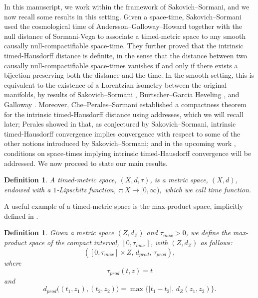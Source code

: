 \documentclass[a4paper,12pt,reqno]{amsart}
\theoremstyle{plain}
\newtheorem{defn}[thm]{Definition}
\newcommand{\be}{\begin{equation}}
\newcommand{\ee}{\end{equation}}
\begin{document}
In this manuscript, we work within the framework of Sakovich--Sormani, and we now recall some results in this setting. Given a space-time, Sakovich--Sormani \cite{SakSor-Notions} used the cosmological time of Andersson--Galloway--Howard \cite{AGH} together with the null distance of Sormani-Vega \cite{SV-Null} to associate a timed-metric space to any smooth causally null-compactifiable space-time. They further proved that the intrinsic timed-Hausdorff distance is definite, in the sense that the distance between two causally null-compactifiable space-times vanishes if and only if there exists a bijection preserving both the distance and the time. In the smooth setting, this is equivalent to the existence of a Lorentzian isometry between the original manifolds, by results of Sakovich--Sormani \cite{SakSor-Null}, Burtscher--Garcia Heveling \cite{Burtscher-Garcia-Heveling-Global}, and Galloway \cite{Galloway-causal}. Moreover, Che--Perales--Sormani \cite{Che-Perales-Sormani-2025} established a compactness theorem for the intrinsic timed-Hausdorff distance using addresses, which we will recall later; Perales showed in \cite{perales-intrinsic-timed-hausdorff} that, as conjectured by Sakovich--Sormani, intrinsic timed-Hausdorff convergence implies convergence with respect to some of the other notions introduced by Sakovich--Sormani; and in the upcoming work \cite{prados-zoghlami}, conditions on space-times implying intrinsic timed-Hausdorff convergence will be addressed.  We now proceed to state our main results. 




\begin{defn}\label{defn:timed-metric-space}
A timed-metric space, 
$(X,d,\tau)$, is a metric space,
$(X,d)$,
endowed with a $1$-Lipschitz function,  
$
\tau:X\to [0,\infty),
$
which we call time function. 
\end{defn}

A useful example of a timed-metric space is the max-product space, implicitly defined in \cite[Propositions~4.24 and 4.25]{SakSor-Notions}.


\begin{defn}\label{def:product space}
Given a metric space $(Z,d_Z)$ and $\tau_{max}>0$, we define 
the max-product space of the compact interval, $[0,\tau_{max}]$, with
$(Z,d_Z)$
as follows:
\be \label{eq:max-prod0}
\left([0,\tau_{max}]\times Z, \,d_{prod}, \,\tau_{prod}\right),
\ee
where
\be \label{eq:max-prod1}
\tau_{prod}(t,z)=t 
\ee
and
\be
\label{eq:max-prod-2}
 d_{prod}\Big((t_1,z_1),(t_2,z_2)\Big)=\max\Big\{|t_1-t_2|,\, d_Z(z_1,z_2)\Big\}.
\ee
\end{defn}
\end{document}
